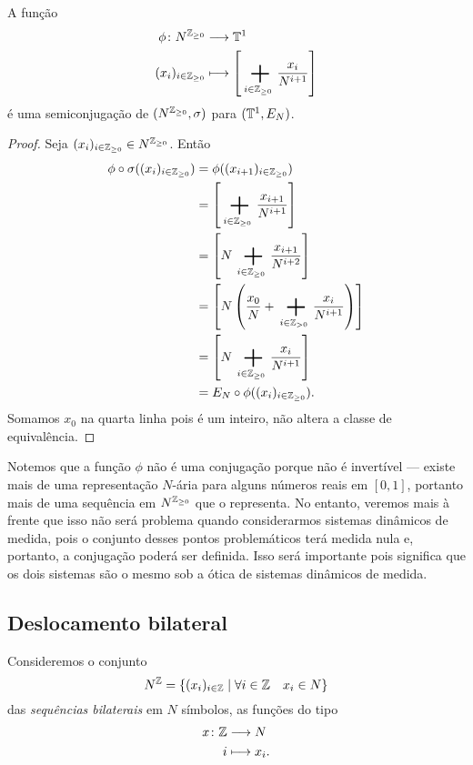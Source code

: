 \begin{proposition}
A função
	\begin{align*}
	\func{\phi}{N^{\Z_{\geq 0}}}{\T^1}{(x_i)_{i \in \Z_{\geq 0}}}{\left[\sum_{i \in \Z_{\geq 0}} \frac{x_i}{N^{i+1}}\right]}
	\end{align*}
é uma semiconjugação de $(N^{\mathbb{Z}_{\geq 0}},\sigma)$ para $(\mathbb{T}^1,E_N)$.
\end{proposition}
\begin{proof}
Seja $(x_i)_{i \in \mathbb{Z}_{\geq 0}} \in N^{\mathbb{Z}_{\geq 0}}$. Então
	\begin{align*}
	\phi \circ \sigma((x_i)_{i \in \Z_{\geq 0}}) &= \phi((x_{i+1})_{i \in \Z_{\geq 0}}) \\
			&=\left[\sum_{i \in \Z_{\geq 0}} \frac{x_{i+1}}{N^{i+1}}\right] \\
			&=\left[N\sum_{i \in \Z_{\geq 0}} \frac{x_{i+1}}{N^{i+2}}\right] \\
			&=\left[N \left(\frac{x_0}{N} + \sum_{i \in \Z_{>0}} \frac{x_{i}}{N^{i+1}}\right)\right] \\
			&=\left[N \sum_{i \in \Z_{\geq 0}} \frac{x_{i}}{N^{i+1}}\right] \\
			&=E_N \circ \phi((x_i)_{i \in \Z_{\geq 0}}).
	\end{align*}
Somamos $x_0$ na quarta linha pois é um inteiro, não altera a classe de equivalência.
\end{proof}

Notemos que a função $\phi$ não é uma conjugação porque não é invertível --- existe mais de uma representação $N$-ária para alguns números reais em $[0,1]$, portanto mais de uma sequência em $N^{\mathbb{Z}_{\geq 0}}$ que o representa. No entanto, veremos mais à frente que isso não será problema quando considerarmos sistemas dinâmicos de medida, pois o conjunto desses pontos problemáticos terá medida nula e, portanto, a conjugação poderá ser definida. Isso será importante pois significa que os dois sistemas são o mesmo sob a ótica de sistemas dinâmicos de medida.


\subsection{Deslocamento bilateral}

Consideremos o conjunto
	\begin{equation*}
	N^{\mathbb{Z}} = \left\{{(x_i)_{i \in \mathbb{Z}}}\;\middle\vert\;{\forall i \in \mathbb{Z} \quad x_i \in N}\right\}
	\end{equation*}
das \emph{sequências bilaterais} em $N$ símbolos, as funções do tipo
	\begin{align*}
	{x}\colon {\mathbb{Z}} &\longrightarrow {N} \\{i} &\longmapsto x_i.
	\end{align*}

